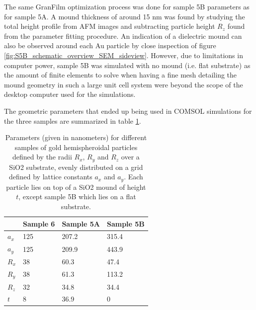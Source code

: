 The same GranFilm optimization process was done for sample 5B parameters as for sample 5A. A mound thickness of around 15 nm  was found by studying the total height profile from AFM images and subtracting particle height $R_z$ found from the parameter fitting procedure. An indication of a dielectric mound can also be observed around each Au particle by close inspection of figure \ref{fig:S5B_schematic_overview_SEM_sideview}. However, due to limitations in computer power, sample 5B was simulated with no mound (i.e. flat substrate) as the amount of finite elements to solve when having a fine mesh detailing the mound geometry in such a large unit cell system were beyond the scope of the desktop computer used for the simulations. 



The geometric parameters that ended up being used in COMSOL simulations for the three samples are summarized in table \ref{tab:GoldLatticeParameters}. 





\begin{table}[h!]
\centering
\caption{Parameters (given in nanometers) for different samples of gold hemispheroidal particles defined by the radii $R_x$, $R_y$ and $R_z$ over a SiO2 substrate, evenly distributed on a grid defined by lattice constants $a_x$ and $a_y$. Each particle lies on top of a SiO2 mound of height $t$, except sample 5B which lies on a flat substrate.}
\label{tab:GoldLatticeParameters}
\begin{tabular}{l l l l}
            &   Sample 6    &   Sample 5A   &   Sample 5B   \\
    \hline 
    $a_x$   &   125       &   207.2         &   315.4            \\
    $a_y$   &   125       &   209.9         &   443.9            \\
    $R_x$   &   38        &   60.3          &   47.4            \\
    $R_y$   &   38        &   61.3          &   113.2            \\
    $R_z$   &   32        &   34.8          &   34.4            \\
    $t$     &   8         &   36.9          &   0            \\
    \hline
\end{tabular}
\end{table}




